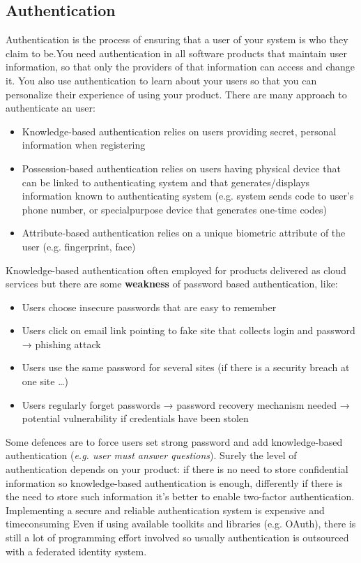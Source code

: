\documentclass[10pt,a4paper]{report}
\begin{document}
\subsection{Authentication}
Authentication is the process of ensuring that a user of your system is who they claim to be.You need authentication in all software products that maintain user information, so that only the providers of that information can access and change it. You also use authentication to learn about your users so that you can
personalize their experience of using your product.
There are many approach to authenticate an user:
\begin{itemize}
	\item Knowledge-based authentication relies on users providing secret, personal
	information when registering
	\item Possession-based authentication relies on users having physical device that can be
	linked to authenticating system and that generates/displays information known to
	authenticating system (e.g. system sends code to user’s phone number, or specialpurpose device that generates one-time codes)
	\item Attribute-based authentication relies on a unique biometric attribute of the user (e.g.
	fingerprint, face) 
\end{itemize}
Knowledge-based authentication often employed for products delivered as cloud services but there are some \textbf{weakness} of password based authentication, like:
\begin{itemize}
	\item Users choose insecure passwords that are easy to remember
	\item Users click on email link pointing to fake site that collects login and password → phishing attack
	\item Users use the same password for several sites (if there is a security breach at one site …)
	\item Users regularly forget passwords → password recovery mechanism needed → potential vulnerability if
	credentials have been stolen
\end{itemize}
Some defences are to force users set strong password and add knowledge-based authentication (\textit{e.g. user must answer questions}). Surely the level of authentication depends on your product: if there is no need to store confidential information so knowledge-based authentication is enough, differently if there is the need to store such information it's better to enable two-factor authentication.\\
Implementing a secure and reliable authentication system is expensive and timeconsuming
Even if using available toolkits and libraries (e.g. OAuth), there is still a lot of programming effort involved so usually authentication is outsourced with a federated identity system.
\end{document}
